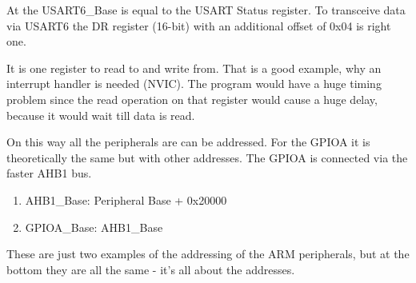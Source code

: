 At the USART6\_Base is equal to the USART Status register. To transceive data
via USART6 the DR register (16-bit) with an additional offset of 0x04 is right
one.

It is one register to read to and write from. That is a good example, why an
interrupt handler is needed (NVIC). The program would have a huge timing problem
since the read operation on that register would cause a huge delay, because
it would wait till data is read.

On this way all the peripherals are can be addressed.
For the GPIOA it is theoretically the same but with other addresses. The GPIOA
is connected via the faster AHB1 bus.
\begin{enumerate}
	\item AHB1\_Base: Peripheral Base + 0x20000
	\item GPIOA\_Base: AHB1\_Base
\end{enumerate}
These are just two examples of the addressing of the ARM peripherals, but at the
bottom they are all the same - it's all about the addresses.
